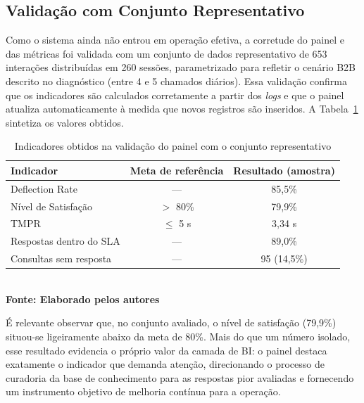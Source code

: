 \documentclass[a4paper,12pt,Times]{article}
\begin{document}
\subsection{Validação com Conjunto Representativo}

Como o sistema ainda não entrou em operação efetiva, a corretude do painel e das métricas
foi validada com um conjunto de dados representativo de 653 interações distribuídas em 260
sessões, parametrizado para refletir o cenário B2B descrito no diagnóstico (entre 4 e 5
chamados diários). Essa validação confirma que os indicadores são calculados corretamente a
partir dos \textit{logs} e que o painel atualiza automaticamente à medida que novos registros
são inseridos. A Tabela~\ref{tab:bi_resultados} sintetiza os valores obtidos.

\begin{table}[ht]
  \centering
  \caption[\hspace{0.1cm}Indicadores obtidos na validação do painel.]{Indicadores obtidos na validação do painel com o conjunto representativo}
  \vspace{0.2cm}
  \begin{tabular}{lcc}
    \hline
    \textbf{Indicador} & \textbf{Meta de referência} & \textbf{Resultado (amostra)} \\
    \hline
    Deflection Rate            & ---            & 85,5\%        \\
    Nível de Satisfação        & $>$ 80\%       & 79,9\%        \\
    TMPR                       & $\leq$ 5 s     & 3,34 s        \\
    Respostas dentro do SLA    & ---            & 89,0\%        \\
    Consultas sem resposta     & ---            & 95 (14,5\%)   \\
    \hline
  \end{tabular}
  \vspace{0.2cm}
  \\\textbf{\footnotesize Fonte: Elaborado pelos autores}
  \label{tab:bi_resultados}
\end{table}

É relevante observar que, no conjunto avaliado, o nível de satisfação (79,9\%) situou-se
ligeiramente abaixo da meta de 80\%. Mais do que um número isolado, esse resultado evidencia
o próprio valor da camada de BI: o painel destaca exatamente o indicador que demanda atenção,
direcionando o processo de curadoria da base de conhecimento para as respostas pior avaliadas
e fornecendo um instrumento objetivo de melhoria contínua para a operação.
\end{document}
